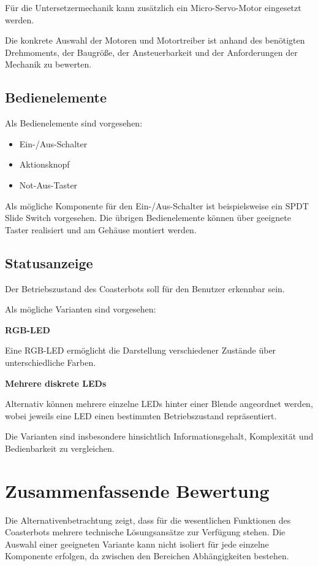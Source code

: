 \documentclass[
  a4paper,
  12pt,
  DIV=12,        %
  parskip=half,  %
  headings=small %
]{scrartcl}
\theoremstyle{definition}
\providecommand{\tightlist}{%
  \setlength{\itemsep}{0pt}\setlength{\parskip}{0pt}}
\theoremstyle{definition}
\begin{document}
Für die Untersetzermechanik kann zusätzlich ein Micro-Servo-Motor
eingesetzt werden.

Die konkrete Auswahl der Motoren und Motortreiber ist anhand des
benötigten Drehmoments, der Baugröße, der Ansteuerbarkeit und der
Anforderungen der Mechanik zu bewerten.

\subsection{Bedienelemente}\label{bedienelemente}

Als Bedienelemente sind vorgesehen:

\begin{itemize}
\tightlist
\item
  Ein-/Aus-Schalter
\item
  Aktionsknopf
\item
  Not-Aus-Taster
\end{itemize}

Als mögliche Komponente für den Ein-/Aus-Schalter ist beispielsweise ein
SPDT Slide Switch vorgesehen. Die übrigen Bedienelemente können über
geeignete Taster realisiert und am Gehäuse montiert werden.

\subsection{Statusanzeige}\label{statusanzeige}

Der Betriebszustand des Coasterbots soll für den Benutzer erkennbar
sein.

Als mögliche Varianten sind vorgesehen:

\textbf{RGB-LED}

Eine RGB-LED ermöglicht die Darstellung verschiedener Zustände über
unterschiedliche Farben.

\textbf{Mehrere diskrete LEDs}

Alternativ können mehrere einzelne LEDs hinter einer Blende angeordnet
werden, wobei jeweils eine LED einen bestimmten Betriebszustand
repräsentiert.

Die Varianten sind insbesondere hinsichtlich Informationsgehalt,
Komplexität und Bedienbarkeit zu vergleichen.

\section{Zusammenfassende Bewertung}\label{zusammenfassende-bewertung}

Die Alternativenbetrachtung zeigt, dass für die wesentlichen Funktionen
des Coasterbots mehrere technische Lösungsansätze zur Verfügung stehen.
Die Auswahl einer geeigneten Variante kann nicht isoliert für jede
einzelne Komponente erfolgen, da zwischen den Bereichen Abhängigkeiten
bestehen.
\end{document}
